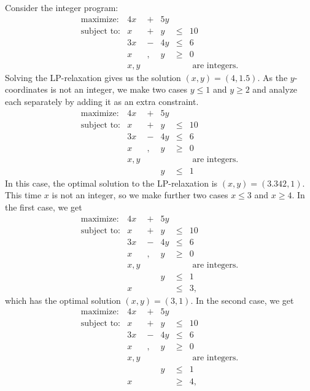 \documentclass[
]{book}
\theoremstyle{definition}
\theoremstyle{definition}
\theoremstyle{definition}
\theoremstyle{definition}
\theoremstyle{remark}
\begin{document}
Consider the integer program:
\begin{equation}
\begin{array}{llllll}
  \mbox{maximize:} & 4x & + & 5y \\ 
  \mbox{subject to:} 
  & x & + & y & \le & 10 \\
  & 3x & - & 4y & \le & 6 \\
  & x &, & y & \ge & 0 \\ 
  & x, y & & & & \mbox{ are integers.}
\end{array}
\end{equation}
Solving the LP-relaxation gives us the solution \((x,y) = (4, 1.5)\).
As the \(y\)-coordinates is not an integer, we make two cases \(y \le 1\) and \(y \ge 2\) and analyze each separately by adding it as an extra constraint.
\begin{equation*}
\begin{array}{llllll}
  \mbox{maximize:} & 4x & + & 5y \\ 
  \mbox{subject to:} 
  & x & + & y & \le & 10 \\
  & 3x & - & 4y & \le & 6 \\
  & x &, & y & \ge & 0 \\ 
  & x, y & & & & \mbox{ are integers.} \\
  & & & y & \le & 1 
\end{array}
\end{equation*}
In this case, the optimal solution to the LP-relaxation is \((x,y) = (3.342, 1)\).
This time \(x\) is not an integer, so we make further two cases \(x \le 3\) and \(x \ge 4\).
In the first case, we get
\begin{equation*}
\begin{array}{llllll}
  \mbox{maximize:} & 4x & + & 5y \\ 
  \mbox{subject to:} 
  & x & + & y & \le & 10 \\
  & 3x & - & 4y & \le & 6 \\
  & x &, & y & \ge & 0 \\ 
  & x, y & & & & \mbox{ are integers.} \\
  & & & y & \le & 1 \\
  &x & & & \le & 3,
\end{array}
\end{equation*}
which has the optimal solution \((x,y) = (3, 1)\).
In the second case, we get
\begin{equation*}
\begin{array}{llllll}
  \mbox{maximize:} & 4x & + & 5y \\ 
  \mbox{subject to:} 
  & x & + & y & \le & 10 \\
  & 3x & - & 4y & \le & 6 \\
  & x &, & y & \ge & 0 \\ 
  & x, y & & & & \mbox{ are integers.} \\
  & & & y & \le & 1 \\
  &x & & & \ge & 4,
\end{array}
\end{equation*}
\end{document}

